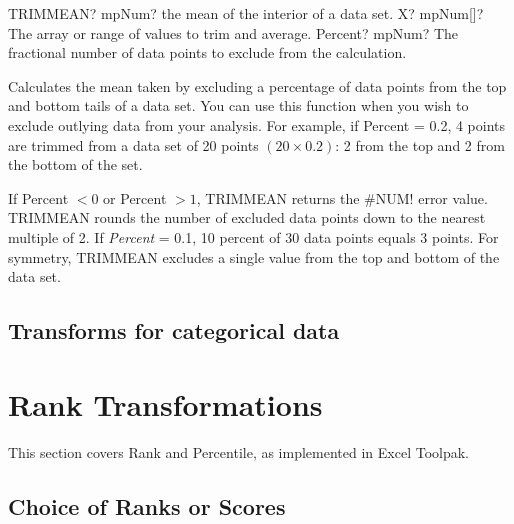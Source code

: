 \begin{mpFunctionsExtract}
	\mpWorksheetFunctionTwoNotImplemented
	{TRIMMEAN? mpNum? the mean of the interior of a data set.}
	{X? mpNum[]? The array or range of values to trim and average.}
	{Percent? mpNum? The fractional number of data points to exclude from the calculation.}
\end{mpFunctionsExtract}



%
Calculates the mean taken by excluding a percentage of data points from the top and bottom tails of a data set. You can use this function when you wish to exclude outlying data from your analysis. For example, if \textsf{Percent} = 0.2, 4 points are trimmed from a data set of 20 points $(20 \times 0.2)$: 2 from the top and 2 from the bottom of the set.

\vspace{0.3cm}
If \textsf{Percent} $< 0$ or \textsf{Percent} $> 1$, \textsf{TRIMMEAN} returns the \#NUM! error value.
\textsf{TRIMMEAN} rounds the number of excluded data points down to the nearest multiple of 2. If \textsf{\textsl{Percent}} = 0.1, 10 percent of 30 data points equals 3 points. For symmetry, \textsf{TRIMMEAN} excludes a single value from the top and bottom of the data set.




\subsection{Transforms for categorical data}



\newpage
\section{Rank Transformations}
\label{Rank and Percentile}

This section covers Rank and Percentile, as implemented in Excel Toolpak.

\subsection{Choice of Ranks or Scores}
\lipsum[2]


